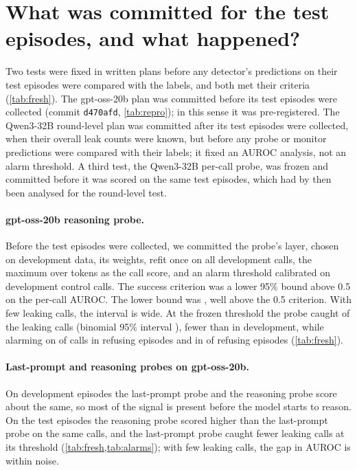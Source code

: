\section{What was committed for the test episodes, and what happened?}
\label{app:confirmation}

Two tests were fixed in written plans before any detector's predictions on their test episodes were compared with the labels, and both met their criteria (\cref{tab:fresh}).
The gpt-oss-20b plan was committed before its test episodes were collected (commit \texttt{d470afd}, \cref{tab:repro}); in this sense it was pre-registered.
The Qwen3-32B round-level plan was committed after its test episodes were collected, when their overall leak counts were known, but before any probe or monitor predictions were compared with their labels; it fixed an AUROC analysis, not an alarm threshold.
A third test, the Qwen3-32B per-call probe, was frozen and committed before it was scored on the same test episodes, which had by then been analysed for the round-level test.

\paragraph{gpt-oss-20b reasoning probe.}
Before the test episodes were collected, we committed the probe's layer, chosen on development data, its weights, refit once on all development calls, the maximum over tokens as the call score, and an alarm threshold calibrated on development control calls.
The success criterion was a lower 95\% bound above 0.5 on the per-call AUROC.
The lower bound was \gptossFreshReasoningLow{}, well above the 0.5 criterion.
With few leaking calls, the interval is wide.
At the frozen threshold the probe caught \gptossFreshCaught{} of the leaking calls (binomial 95\% interval \gptossFreshCaughtCI{}), fewer than in development, while alarming on \gptFreshAlarmOne{} of calls in refusing episodes and in \gptossFreshRefusingEpisodeAlarm{} of refusing episodes (\cref{tab:fresh}).

\paragraph{Last-prompt and reasoning probes on gpt-oss-20b.}
On development episodes the last-prompt probe and the reasoning probe score about the same, so most of the signal is present before the model starts to reason.
On the test episodes the reasoning probe scored higher than the last-prompt probe on the same calls, and the last-prompt probe caught fewer leaking calls at its threshold (\cref{tab:fresh,tab:alarms}); with few leaking calls, the gap in AUROC is within noise.

